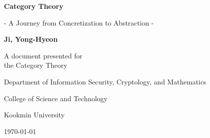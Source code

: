 \begin{titlepage}
    \centering
    
    \vspace*{1cm}
    
    \Huge\textsf{\textbf{Category Theory}}
    
    \vspace{0.5cm}
    \LARGE\textsf{- A Journey from Concretization to Abstraction -}
    
    \vspace{1.5cm}
    \textbf{Ji, Yong-Hyeon}
    
    \vfill
    \begin{center}
    \end{center}
    \vfill
    A document presented for\\
    the Category Theory
    
    \vspace{0.8cm}
    {\large\textsf{Department of Information Security, Cryptology, and Mathematics}\par}
    {\large\textsf{College of Science and Technology}\par}
    {\large\textsf{Kookmin University}\par}
    \vspace{.25in}
    {\large \textsf{\today}\par}
    
\end{titlepage}

